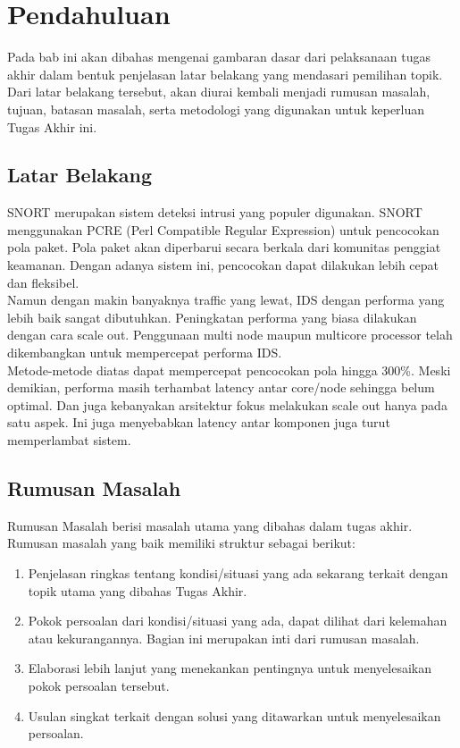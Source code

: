 \chapter{Pendahuluan}

Pada bab ini akan dibahas mengenai gambaran dasar dari pelaksanaan tugas akhir dalam bentuk penjelasan latar belakang yang mendasari pemilihan topik. Dari latar belakang tersebut, akan diurai kembali menjadi rumusan masalah, tujuan, batasan masalah, serta metodologi yang digunakan untuk keperluan Tugas Akhir ini.

\section{Latar Belakang}

SNORT merupakan sistem deteksi intrusi yang populer digunakan. SNORT menggunakan PCRE (Perl Compatible Regular Expression) untuk pencocokan pola paket. Pola paket akan diperbarui secara berkala dari komunitas penggiat keamanan. Dengan adanya sistem ini, pencocokan dapat dilakukan lebih cepat dan fleksibel. \\
Namun dengan makin banyaknya traffic yang lewat, IDS dengan performa yang lebih baik sangat dibutuhkan. Peningkatan performa yang biasa dilakukan dengan cara scale out. Penggunaan multi node maupun multicore processor telah dikembangkan untuk mempercepat performa IDS. \\
Metode-metode diatas dapat mempercepat pencocokan pola hingga 300\%. Meski demikian, performa masih terhambat latency antar core/node sehingga belum optimal. Dan juga kebanyakan arsitektur fokus melakukan scale out hanya pada satu aspek. Ini juga menyebabkan latency antar komponen juga turut memperlambat sistem. 


\section{Rumusan Masalah}

Rumusan Masalah berisi masalah utama yang dibahas dalam tugas akhir. Rumusan masalah yang baik memiliki struktur sebagai berikut:

\begin{enumerate}
    \item Penjelasan ringkas tentang kondisi/situasi yang ada sekarang terkait dengan topik utama yang dibahas Tugas Akhir.
    \item Pokok persoalan dari kondisi/situasi yang ada, dapat dilihat dari kelemahan atau kekurangannya. Bagian ini merupakan inti dari rumusan masalah.
    \item Elaborasi lebih lanjut yang menekankan pentingnya untuk menyelesaikan pokok persoalan tersebut.
    \item Usulan singkat terkait dengan solusi yang ditawarkan untuk menyelesaikan persoalan.
\end{enumerate}


